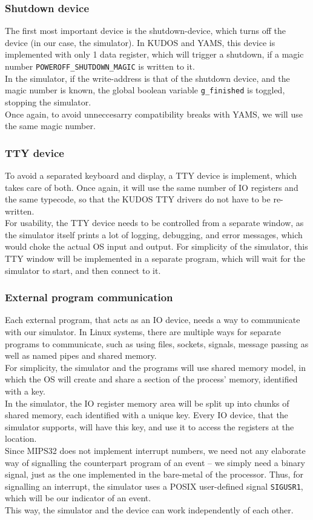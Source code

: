 \subsubsection{Shutdown device}
The first most important device is the shutdown-device, which turns off the
device (in our case, the simulator).
In KUDOS and YAMS, this device is implemented with only 1 data register, which
will trigger a shutdown, if a magic number \texttt{POWEROFF\_SHUTDOWN\_MAGIC} is
written to it\cite[drivers/metadev.h]{kudos}.\\
In the simulator, if the write-address is that of the shutdown device, and the
magic number is known, the global boolean variable \texttt{g\_finished} is
toggled, stopping the simulator.\\
Once again, to avoid unneccesarry compatibility breaks with YAMS, we will use
the same magic number.

\subsubsection{TTY device}
To avoid a separated keyboard and display, a TTY device is implement, which
takes care of both. Once again, it will use the same number of IO registers
and the same typecode, so that the KUDOS TTY drivers do not have to be
re-written.\\
For usability, the TTY device needs to be controlled from a separate window, as
the simulator itself prints a lot of logging, debugging, and error messages,
which would choke the actual OS input and output.
For simplicity of the simulator, this TTY window will be implemented in a
separate program, which will wait for the simulator to start, and then connect
to it.\\

\subsubsection{External program communication}
Each external program, that acts as an IO device, needs a way
to communicate with our simulator. In Linux systems, there are multiple ways for
separate programs to communicate, such as using files, sockets, signals,
message passing as well as named pipes and shared memory\cite{love2013linux}.\\
For simplicity, the simulator and the programs will use shared memory model,
in which the OS will create and share a section of the process' memory,
identified with a key.\\
In the simulator, the IO register memory area will be split up into chunks of
shared memory, each identified with a unique key. Every IO device, that the
simulator supports, will have this key, and use it to access the registers at
the location.\\
Since MIPS32 does not implement interrupt numbers, we need not any elaborate
way of signalling the counterpart program of an event -- we simply need a binary
signal, just as the one implemented in the bare-metal of the processor. Thus,
for signalling an interrupt, the simulator uses a POSIX user-defined signal
\texttt{SIGUSR1}, which will be our indicator of an event.\\
This way, the simulator and the device can work independently of each other.

